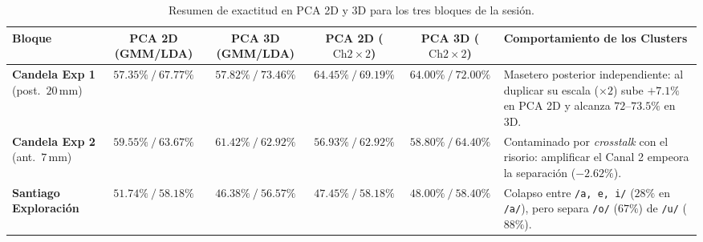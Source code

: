 \documentclass[11pt, a4paper]{article}
\begin{document}
\begin{table}[H]
\centering
\scriptsize
\begin{tabularx}{\textwidth}{l c c c c X}
\toprule
\textbf{Bloque} & \textbf{PCA 2D} (GMM/LDA) & \textbf{PCA 3D} (GMM/LDA) & \textbf{PCA 2D ($\text{Ch2}\times 2$)} & \textbf{PCA 3D ($\text{Ch2}\times 2$)} & \textbf{Comportamiento de los Clusters} \\
\midrule
\textbf{Candela Exp 1} (post.\ $20\,\text{mm}$) & $57.35\%\ /\ 67.77\%$ & $57.82\%\ /\ \mathbf{73.46\%}$ & $\mathbf{64.45\%}\ /\ 69.19\%$ & $64.00\%\ /\ \mathbf{72.00\%}$ & Masetero posterior independiente: al duplicar su escala ($\times 2$) sube $+7.1\%$ en PCA 2D y alcanza $72\text{--}73.5\%$ en 3D. \\
\textbf{Candela Exp 2} (ant.\ $7\,\text{mm}$)  & $59.55\%\ /\ 63.67\%$ & $61.42\%\ /\ 62.92\%$ & $56.93\%\ /\ 62.92\%$ & $58.80\%\ /\ 64.40\%$ & Contaminado por \textit{crosstalk} con el risorio: amplificar el Canal 2 empeora la separación ($-2.62\%$). \\
\textbf{Santiago Exploración}                   & $51.74\%\ /\ 58.18\%$ & $46.38\%\ /\ 56.57\%$ & $47.45\%\ /\ 58.18\%$ & $48.00\%\ /\ 58.40\%$ & Colapso entre \texttt{/a, e, i/} ($28\%$ en \texttt{/a/}), pero separa \texttt{/o/} ($67\%$) de \texttt{/u/} ($88\%$). \\
\bottomrule
\end{tabularx}
\caption{Resumen de exactitud en PCA 2D y 3D para los tres bloques de la sesión.}
\label{tab:pca_compacta}
\end{table}
\end{document}
